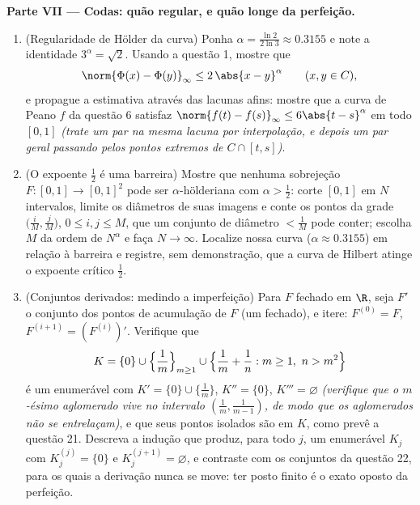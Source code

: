 \begin{problem}
\medskip
\noindent\textbf{Parte VII --- Codas: quão regular, e quão longe da
perfeição.}
\begin{enumerate}[resume]
  \item (Regularidade de Hölder da curva) Ponha $\alpha =
        \frac{\ln 2}{2\ln 3} \approx 0.3155$ e note a
        identidade $3^\alpha = \sqrt2$. Usando a questão 1, mostre que
        \[
        \norm{\Phi(x) - \Phi(y)}_\infty \leq 2\,\abs{x -
        y}^\alpha \qquad (x, y \in C),
        \]
        e propague a estimativa através das lacunas afins: mostre que a
        curva de Peano $f$ da questão 6 satisfaz $\norm{f(t) - f(s)}_\infty \leq 6\abs{t - s}^\alpha$ em todo
        $[0,1]$ \emph{(trate um par na mesma lacuna por
        interpolação, e depois um par geral passando pelos pontos
        extremos de $C \cap [t, s]$)}.
  \item (O expoente $\frac12$ é uma barreira) Mostre que nenhuma sobrejeção
        $F \colon [0,1] \to [0,1]^2$ pode ser $\alpha$-hölderiana com $\alpha > \frac12$: corte
        $[0,1]$ em $N$ intervalos, limite os diâmetros de suas
        imagens e conte os pontos da grade $\bigl(\frac iM, \frac jM\bigr)$, $0 \leq i, j \leq M$, que um conjunto
        de diâmetro $< \frac1M$ pode conter; escolha $M$ da ordem de $N^\alpha$
        e faça $N \to \infty$. Localize nossa curva ($\alpha \approx 0.3155$) em relação à barreira
        e registre, sem demonstração, que a curva de Hilbert atinge o
        expoente crítico $\frac12$.
  \item (Conjuntos derivados: medindo a imperfeição) Para $F$
        fechado em $\R$, seja $F'$ o conjunto dos pontos de
        acumulação de $F$ (um fechado), e itere: $F^{(0)} = F$, $F^{(i+1)}
        = (F^{(i)})'$.
        Verifique que
        \[
        K = \{0\} \cup \Bigl\{\frac1m\Bigr\}_{m \geq 1} \cup
        \Bigl\{\frac1m + \frac1n : m \geq 1,\ n > m^2\Bigr\}
        \]
        é um  enumerável com $K' = \{0\} \cup
        \{\frac1m\}$, $K'' = \{0\}$, $K''' = \varnothing$ \emph{(verifique
        que o $m$-ésimo aglomerado vive no intervalo $(\frac1m, \frac1{m-1})$, de modo
        que os aglomerados não se entrelaçam)}, e que seus pontos
        isolados são  em $K$, como prevê a questão 21.
        Descreva a indução que produz, para todo $j$, um 
        enumerável $K_j$ com $K_j^{(j)} = \{0\}$ e $K_j^{(j+1)} =
        \varnothing$, e contraste com os
        conjuntos  da questão 22, para os quais a derivação
        nunca se move: ter posto finito é o exato oposto da perfeição.
\end{enumerate}
\end{problem}
